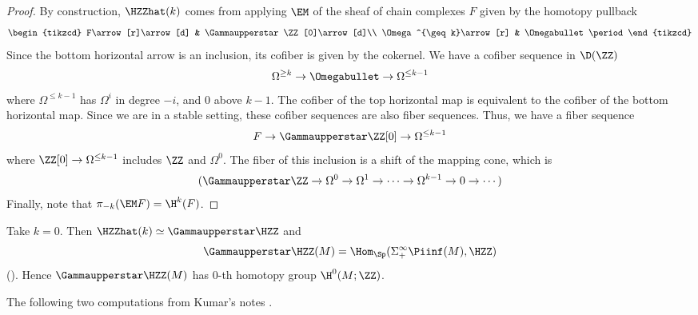 \begin{proof}
	By construction, $\HZZhat(k)$ comes from applying $\EM$ of the sheaf of chain complexes $F$ given by the homotopy pullback
	\begin{equation*}
		\begin{tikzcd}
			F\arrow[r]\arrow[d] & \Gammaupperstar \ZZ[0]\arrow[d]\\
			\Omega^{\geq k}\arrow[r] & \Omegabullet \period
		\end{tikzcd}
	\end{equation*}
	Since the bottom horizontal arrow is an inclusion, its cofiber is given by the cokernel. 
	We have a cofiber sequence in $ \D(\ZZ) $
	\begin{equation*}
		\Omega^{\geq k}\to\Omegabullet\to\Omega^{\leq k-1}
	\end{equation*}
	where $\Omega^{\leq k-1}$ has $\Omega^i$ in degree $-i$, and $0$ above $k-1$. 
	The cofiber of the top horizontal map is equivalent to the cofiber of the bottom horizontal map. 
	Since we are in a stable setting, these cofiber sequences are also fiber sequences. 
	Thus, we have a fiber sequence
	\begin{equation*}
		F\to\Gammaupperstar \ZZ[0]\to\Omega^{\leq k-1}
	\end{equation*}
	where $\ZZ[0]\to\Omega^{\leq k-1}$ includes $\ZZ$ and $\Omega^0$. 
	The fiber of this inclusion is a shift of the mapping cone, which is
	\begin{equation*}
		(\Gammaupperstar \ZZ\to\Omega^0\to\Omega^1\to\cdots\to\Omega^{k-1}\to 0\to\cdots)
	\end{equation*}
	Finally, note that $ \pi_{-k}(\EM F) = \H^k(F) $.
\end{proof}

\begin{example}
	Take $k=0$. 
	Then $\HZZhat(k)\simeq\Gammaupperstar \HZZ$ and 
	\begin{equation*}
		\Gammaupperstar \HZZ(M) = \Hom_{\Sp}(\Sigma_{+}^{\infty} \Piinf(M),\HZZ)
	\end{equation*}
	().
	Hence $ \Gammaupperstar \HZZ(M) $ has $ 0 $-th homotopy group $\H^0(M;\ZZ)$.	
\end{example}

The following two computations from Kumar's notes \cite{Nilay}.

